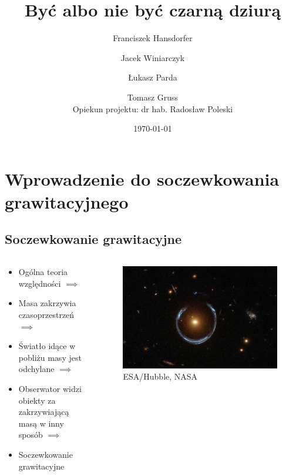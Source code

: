 \documentclass{beamer}
\title{Być albo nie być czarną dziurą}
\author[F. Hansdorfer \and J. Winiarczyk \and Ł. Parda
\and T. Gruss]{Franciszek Hansdorfer \and Jacek Winiarczyk \and Łukasz Parda
\and Tomasz Gruss\\{\small Opiekun projektu: dr hab. Radosław Poleski}}
\date{\today}
\begin{document}
\begin{frame}
    \titlepage
\end{frame}
\section{Wprowadzenie do soczewkowania grawitacyjnego}
\subsection{Soczewkowanie grawitacyjne}

\begin{frame}
    \begin{columns}
        \begin{column}{0.5\linewidth}
            \begin{itemize}
                \item Ogólna teoria względności $\implies$
                \item Masa zakrzywia czasoprzestrzeń $\implies$
                \item Światło idące w pobliżu masy jest odchylane $\implies$
                \item Obserwator widzi obiekty za zakrzywiającą masą w inny sposób $\implies$
                \item Soczewkowanie grawitacyjne
            \end{itemize}
        \end{column}
        \begin{column}{0.5\linewidth}
            \begin{figure}
                \includegraphics[width=\textwidth]{A_Horseshoe_Einstein_Ring_from_Hubble.jpeg}
                \caption*{\tiny{ESA/Hubble, NASA}}
            \end{figure}
        \end{column}
    \end{columns}
\end{frame}
\end{document}
